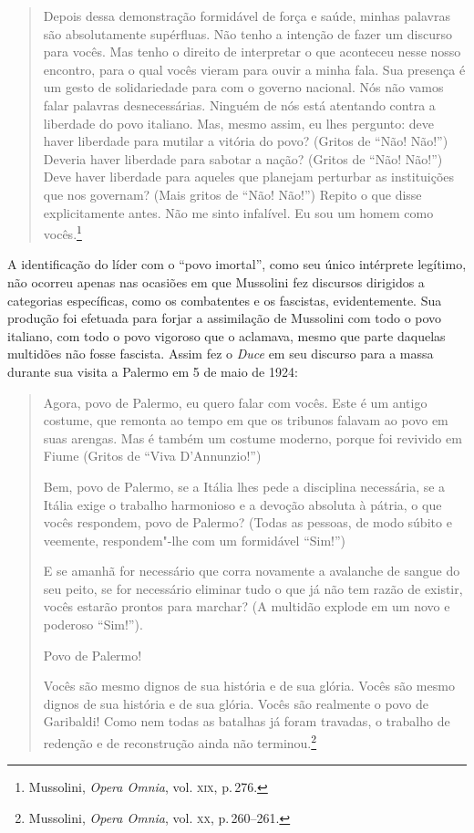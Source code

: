 \begin{quote}
Depois dessa demonstração formidável de força e saúde, minhas palavras
são absolutamente supérfluas. Não tenho a intenção de fazer um discurso
para vocês. Mas tenho o direito de interpretar o que aconteceu nesse
nosso encontro, para o qual vocês vieram para ouvir a minha fala. Sua
presença é um gesto de solidariedade para com o governo nacional. Nós
não vamos falar palavras desnecessárias. Ninguém de nós está atentando
contra a liberdade do povo italiano. Mas, mesmo assim, eu lhes pergunto:
deve haver liberdade para mutilar a vitória do povo? (Gritos de ``Não!
Não!'') Deveria haver liberdade para sabotar a nação? (Gritos de ``Não!
Não!'') Deve haver liberdade para aqueles que planejam perturbar as
instituições que nos governam? (Mais gritos de ``Não! Não!'') Repito o
que disse explicitamente antes. Não me sinto infalível. Eu sou um homem
como vocês.\footnote{Mussolini, \emph{Opera Omnia}, vol. \textsc{xix}, p.\,276.}
\end{quote}

A identificação do líder com o ``povo imortal'', como seu único
intérprete legítimo, não ocorreu apenas nas ocasiões em que Mussolini
fez discursos dirigidos a categorias específicas, como os combatentes e
os fascistas, evidentemente. Sua produção foi efetuada para forjar a
assimilação de Mussolini com todo o povo italiano, com todo o povo
vigoroso que o aclamava, mesmo que parte daquelas multidões não fosse
fascista. Assim fez o \emph{Duce} em seu discurso para a massa durante
sua visita a Palermo em 5 de maio de 1924:

\begin{quote}
Agora, povo de Palermo, eu quero falar com vocês. Este é um antigo
costume, que remonta ao tempo em que os tribunos falavam ao povo em suas
arengas. Mas é também um costume moderno, porque foi revivido em Fiume
(Gritos de ``Viva D'Annunzio!'')

Bem, povo de Palermo, se a Itália lhes pede a disciplina necessária, se
a Itália exige o trabalho harmonioso e a devoção absoluta à pátria, o
que vocês respondem, povo de Palermo? (Todas as pessoas, de modo súbito
e veemente, respondem"-lhe com um formidável ``Sim!'')

E se amanhã for necessário que corra novamente a avalanche de sangue do
seu peito, se for necessário eliminar tudo o que já não tem razão de
existir, vocês estarão prontos para marchar? (A multidão explode em um
novo e poderoso ``Sim!'').

Povo de Palermo!

Vocês são mesmo dignos de sua história e de sua glória. Vocês são mesmo
dignos de sua história e de sua glória. Vocês são realmente o povo de
Garibaldi! Como nem todas as batalhas já foram travadas, o trabalho de
redenção e de reconstrução ainda não terminou.\footnote{Mussolini,
  \emph{Opera Omnia}, vol. \textsc{xx}, p.\,260--261.}
\end{quote}

